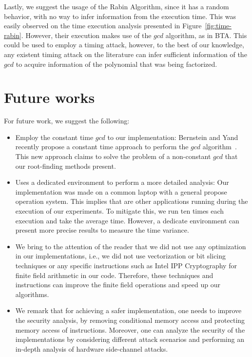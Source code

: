 Lastly, we suggest the usage of the Rabin Algorithm, since it has a random behavior, with no way to infer information from the execution time. This was easily observed on the time execution analysis presented in Figure~\ref{fig:time-rabin}. However, their execution makes use of the $gcd$ algorithm, as in BTA. This could be used to employ a timing attack, however, to the best of our knowledge, any existent timing attack on the literature can infer sufficient information of the $gcd$ to acquire information of the polynomial that was being factorized.

\section{Future works}
For future work, we suggest the following:

\begin{itemize}
    \item Employ the constant time $gcd$ to our implementation: Bernstein and Yand recently propose a constant time approach to perform the $gcd$ algorithm~\cite{Bernstein_Yang_2019}. This new approach claims to solve the problem of a non-constant $gcd$ that our root-finding methods present. 
    \item Uses a dedicated environment to perform a more detailed analysis: Our implementation was made on a common laptop with a general propose operation system. This implies that are other applications running during the execution of our experiments. To mitigate this, we run ten times each execution and take the average time. However, a dedicate environment can present more precise results to measure the time variance. 
    \item We bring to the attention of the reader that we did not use any optimization in our implementations, i.e., we did not use vectorization or bit slicing techniques or any specific instructions such as Intel\textsuperscript{\tiny\textregistered} IPP Cryptography for finite field arithmetic in our code. Therefore, these techniques and instructions can improve the finite field operations and speed up our algorithms.
    \item We remark that for achieving a safer implementation, one needs to improve the security analysis, by removing conditional memory access and protecting memory access of instructions. Moreover, one can analyze the security of the implementations by considering different attack scenarios and performing an in-depth analysis of hardware side-channel attacks. 
\end{itemize}
